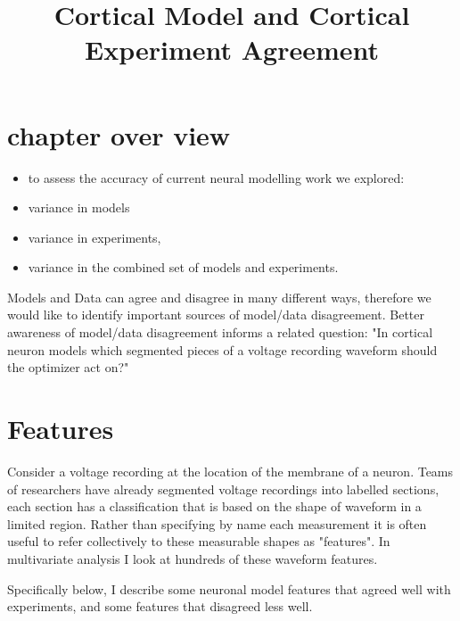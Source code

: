 
\section{chapter over view}
\begin{itemize}

\item to assess the accuracy of current neural modelling work we explored:
\item variance in models
\item variance in experiments,  
\item variance in the combined set of models and experiments.


\end{itemize}


\title{Cortical Model and Cortical Experiment Agreement}
Models and Data can agree and disagree in many different ways, therefore we would like to identify important sources of model/data disagreement. Better awareness of model/data disagreement informs a related question: "In  cortical neuron models which segmented pieces of a voltage recording waveform should the optimizer act on?"

\section{Features} Consider a voltage recording at the location of the membrane of a neuron. Teams of researchers have already segmented voltage recordings into labelled sections, each section has a classification that is based on the shape of waveform in a limited region. Rather than specifying by name each measurement it is often useful to refer collectively to these measurable shapes as "features". In multivariate analysis I look at hundreds of these waveform features. 

Specifically below, I describe some neuronal model features that agreed well with experiments, and some features that disagreed less well.
    
\begin{center}
\end{center}
{ \hspace*{\fill} \\}

\begin{center}



\end{center}
{ \hspace*{\fill} \\}


